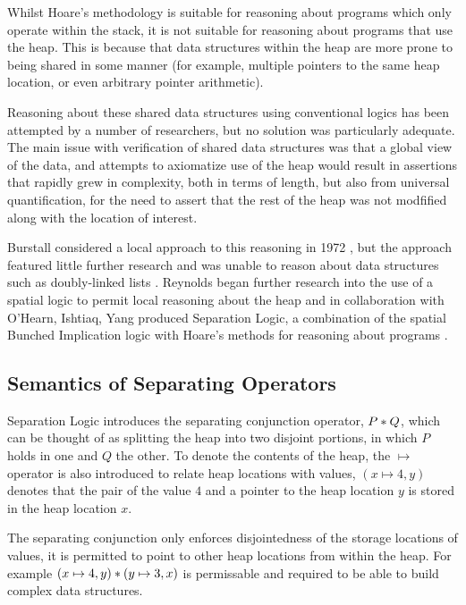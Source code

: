 \documentclass[a4paper,notitlepage]{report}
\begin{document}
  Whilst Hoare's methodology is suitable for reasoning about programs which only
  operate within the stack, it is not suitable for reasoning about programs that
  use the heap. This is because that data structures within the heap are more
  prone to being shared in some manner (for example, multiple pointers to the
  same heap location, or even arbitrary pointer arithmetic).

  Reasoning about these shared data structures using conventional logics has been attempted by a number of
  researchers, but no solution was particularly adequate. The main issue with
  verification of shared data structures was that a global view of the data, and
  attempts to axiomatize use of the heap would result in assertions
  that rapidly grew in complexity, both in terms of length, but also from
  universal quantification, for the need to assert that the rest of the heap was
  not modfified along with the location of interest.

  Burstall considered a local approach to this reasoning in 1972
  \cite{burstall1972some}, but the approach featured little further research and
  was unable to reason about data structures such as doubly-linked lists
  \cite{reynolds2000intuitionistic}. Reynolds began further research into the
  use of a spatial logic to permit local reasoning about the heap and in
  collaboration with O'Hearn, Ishtiaq, Yang produced Separation Logic, a
  combination of the spatial Bunched Implication logic with Hoare's methods for
  reasoning about programs
  \cite{Ishtiaq2001BI,OHearn2001Local,reynolds2000intuitionistic,Reynolds2002Separation}.

  \subsection{Semantics of Separating Operators}

  Separation Logic introduces the separating conjunction operator, $P \mathbin{*} Q$,
  which can be thought of as splitting the heap into two disjoint portions, in
  which $P$ holds in one and $Q$ the other. To denote the contents of the
  heap, the $\mapsto$ operator is also introduced to relate heap locations with
  values, $(x \mapsto 4, y)$ denotes that the pair of the value $4$ and a pointer
  to the heap location $y$ is stored in the heap location $x$.

  The separating conjunction only enforces disjointedness of the storage
  locations of values, it is permitted to point to other heap locations from
  within the heap. For example $(x \mapsto 4, y) \mathbin{*} (y \mapsto 3, x)$ is
  permissable and required to be able to build complex data structures.
\end{document}
